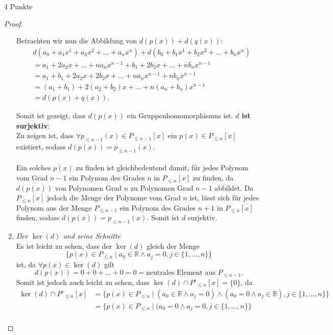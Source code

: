 \documentclass{problemset}
\begin{document}
\begin{problem}{4 Punkte}
\begin{proof}
\begin{enumerate}
		      Betrachten wir nun die Abbildung von $d(p(x)) + d(q(x))$:
		      \begin{align}
			       & d(a_0 + a_1x^1 + a_2x^2 + \ldots + a_nx^n) + d(b_0 + b_1x^1 + b_2x^2 + \ldots + b_nx^n) \\
			       & = a_1 + 2a_2x + \ldots + na_nx^{n-1} + b_1 + 2b_2x + \ldots + nb_nx^{n-1}               \\
			       & = a_1 + b_1 + 2a_2x + 2b_2x + \ldots + na_nx^{n-1} + nb_nx^{n-1}                        \\
			       & = (a_1 + b_1) + 2(a_2 + b_2)x + \ldots + n(a_n+b_n)x^{n-1}                              \\
			       & = d(p(x) + q(x)).
		      \end{align}

		      Somit ist gezeigt, dass $d(p(x))$ ein Gruppenhomomorphismus ist.
		      \checkmark
		      \textbf{$d$ ist surjektiv}: \\
		      Zu zeigen ist, dass $\forall p_{\le n-1}(x) \in P_{\le n-1}[x]$ ein $p(x) \in P_{\le n}[x]$ existiert, sodass $d(p(x)) = p_{\le n-1}(x)$.
		      \\\\
		      Ein solches $p(x)$ zu finden ist gleichbedeutend damit, für jedes Polynom vom Grad $n-1$ ein Polynom des Grades $n$ in $P_{\le n}[x]$ zu finden,
		      da $d(p(x))$ von Polynomen Grad $n$ zu Polynomen Grad $n-1$ abbildet.
		      Da $P_{\le n}[x]$ jedoch die Menge der Polynome vom Grad $n$ ist,
		      lässt sich für jedes Polynom aus der Menge $P_{\le n - 1}$ ein Polynom des Grades $n+1$ in $P_{\le n}[x]$ finden, sodass $d(p(x)) = p_{\le n -1}(x)$.
		      Somit ist $d$ surjektiv.
		      \checkmark
		\item \textit{Der $\ker(d)$ und seine Schnitte} \\
		      Es ist leicht zu sehen, dass der $\ker(d)$ gleich der Menge
		      \[
			      \{p(x) \in P_{\le n} \mid a_0 \in \mathbb{R} \land a_j = 0, j \in \{1, \ldots, n\}\}
		      \]
		      ist, da $\forall p(x) \in \ker(d)$ gilt
		      \[
			      d(p(x)) = 0 + 0 + \ldots + 0 = 0 = \text{neutrales Element aus } P_{\le n-1}.
		      \]
		      Somit ist jedoch auch leicht zu sehen, dass $\ker(d) \cap P'_{\le n}[x] = \{0\}$, da
		      \begin{align}
			      \ker(d) \cap P'_{\le n}[x] & = \{p(x) \in P_{\le n} \mid (a_0 \in \mathbb{R} \land a_j = 0) \land (a_0 = 0 \land a_j \in \mathbb{R}), j \in \{1, \ldots, n\}\} \\
			                                 & = \{p(x) \in P_{\le n} \mid (a_0 = 0 \land a_j = 0, j \in \{1, \ldots, n\}\}                                                      \\

\end{align}
\end{enumerate}
\end{proof}
\end{problem}
\end{document}
